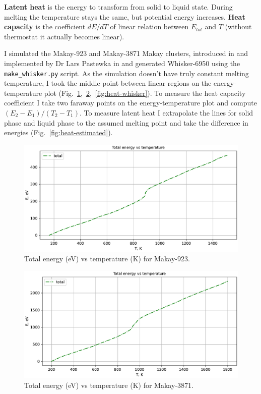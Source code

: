 \documentclass[12pt,a4paper]{article}
\begin{document}
{\bf Latent heat} is the energy to transform from solid to liquid state. During melting the temperature stays the same, but potential energy increases. {\bf Heat capacity} is the coefficient $dE/dT$ of linear relation between $E_{tot}$ and $T$ (without thermostat it actually becomes linear).

I simulated the Makay-923 and Makay-3871 Makay clusters, introduced in \cite{MakayOriginal} and implemented by Dr Lars Pastewka in \cite{MakayPastewka} and generated Whisker-6950 using the \verb|make_whisker.py| script.
As the simulation doesn't have truly constant melting temperature, I took the middle point between linear regions on the energy-temperature plot (Fig.~\ref{fig:heat-makay1},~\ref{fig:heat-makay2},~\ref{fig:heat-whisker}). To measure the heat capacity coefficient I take two faraway points on the energy-temperature plot and compute $(E_2-E_1)/(T_2-T_1)$. To measure latent heat I extrapolate the lines for solid phase and liquid phase to the assumed melting point and take the difference in energies (Fig.~\ref{fig:heat-estimated}).

\begin{figure}[h!]
	\centering
	\includegraphics[width=.8\linewidth]{img/milestone07-small.pdf}
	\caption{Total energy (eV) vs temperature (K) for Makay-923.}
	\label{fig:heat-makay1}
\end{figure}

\begin{figure}[h!]
	\centering
	\includegraphics[width=.95\linewidth]{img/milestone07-large.pdf}
	\caption{Total energy (eV) vs temperature (K) for Makay-3871.}
	\label{fig:heat-makay2}
\end{figure}
\end{document}
